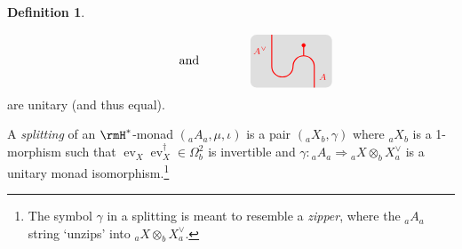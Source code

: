 \documentclass[12pt, reqno]{amsart}
\newcommand{\tikzmath}[2][]
{\vcenter{\hbox{\begin{tikzpicture}[#1]#2\end{tikzpicture}}}
}
\newcommand{\AsColor}{red}
\newcommand{\AColor}{lightgray!50}
\DeclareMathOperator{\ev}{ev}
\theoremstyle{plain}
\theoremstyle{definition}
\newtheorem{defn}[thm]{Definition}
\begin{document}
\begin{defn}
\begin{enumerate}[label=($\rmH^*$\arabic*)]
$${}
\qquad\qquad\text{and}\qquad\qquad
\tikzmath{
\fill[\AColor, rounded corners=5pt] (-1.8,-.3) rectangle (.5,1.2);
\draw[\AsColor,thick] (0,-.3) --node[right]{$\scriptstyle A$} (0,.3) arc (0:180:.3cm) arc (0:-180:.3cm) --node[left]{$\scriptstyle A^\vee$} (-1.2,1.2);
\draw[\AsColor,thick] (-.3,.9) -- (-.3,.6);
\filldraw[\AsColor] (-.3,.9) circle (.05cm);
}
$$
are unitary (and thus equal).
\end{enumerate}
A \emph{splitting} of an $\rmH^*$-monad $({}_aA_a,\mu,\iota)$ is a pair $({}_aX_b,\gamma)$ where ${}_aX_b$ is a 1-morphism such that $\ev_X\ev_X^\dag \in \Omega^2_b$ is invertible and $\gamma\colon {}_aA_a\Rightarrow {}_aX\otimes_b X^\vee_a$ is a unitary monad isomorphism.\footnote{The symbol $\gamma$ in a splitting is meant to resemble a \emph{zipper}, where the ${}_aA_a$ string `unzips' into ${}_aX\otimes_b X^\vee_a$.
}
\end{defn}
\end{document}
